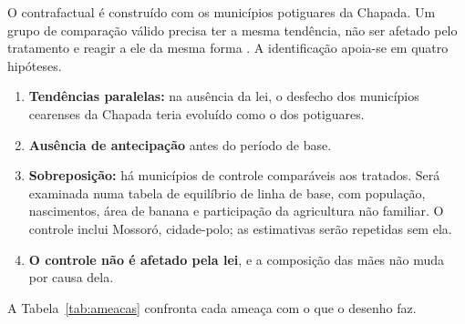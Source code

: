 O contrafactual é construído com os municípios potiguares da Chapada. Um grupo
de comparação válido precisa ter a mesma tendência, não ser afetado pelo
tratamento e reagir a ele da mesma forma \cite{gertler2016}. A identificação
apoia-se em quatro hipóteses.

\begin{enumerate}
\item \textbf{Tendências paralelas:} na ausência da lei, o desfecho dos
municípios cearenses da Chapada teria evoluído como o dos potiguares.
\item \textbf{Ausência de antecipação} antes do período de base.
\item \textbf{Sobreposição:} há municípios de controle comparáveis aos tratados.
Será examinada numa tabela de equilíbrio de linha de base, com população,
nascimentos, área de banana e participação da agricultura não familiar. O
controle inclui Mossoró, cidade-polo; as estimativas serão repetidas sem ela.
\item \textbf{O controle não é afetado pela lei}, e a composição das mães não
muda por causa dela.
\end{enumerate}

A Tabela~\ref{tab:ameacas} confronta cada ameaça com o que o desenho faz.


